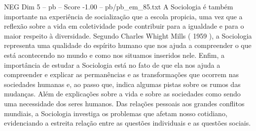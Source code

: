 \begin{textsample}{NEG Dim 5 – pb – Score -1.00 – pb/pb\_em\_85.txt}
A Sociologia é também importante na experiência de socialização que a escola propicia, uma vez que a reflexão sobre a vida em coletividade pode contribuir para a igualdade e para o maior respeito à diversidade.
Segundo Charles Whight Mills ( 1959 ), a Sociologia representa uma qualidade do espírito humano que nos ajuda a compreender o que está acontecendo no mundo e como nos situamos inseridos nele.
Enfim, a importância de estudar a Sociologia está no fato de que ela nos ajuda a compreender e explicar as permanências e as transformações que ocorrem nas sociedades humanas e, ao passo que, indica algumas pistas sobre os rumos das mudanças.
Além de explicações sobre a vida e sobre as sociedades como sendo uma necessidade dos seres humanos.
Das relações pessoais aos grandes conflitos mundiais, a Sociologia investiga os problemas que afetam nosso cotidiano, evidenciando a estreita relação entre as questões individuais e as questões sociais.

\end{textsample}
